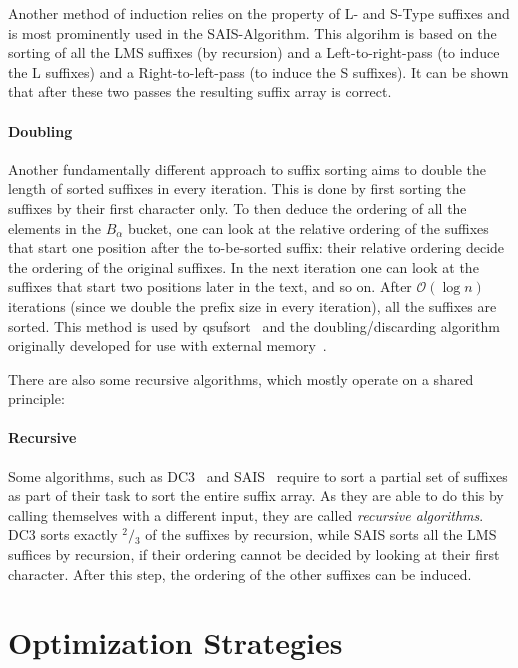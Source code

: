 Another method of induction relies on the property of L- and S-Type suffixes and
is most prominently used in the SAIS-Algorithm.
This algorihm is based on the sorting of all the LMS suffixes (by recursion)
and a Left-to-right-pass (to induce the L suffixes)
and a Right-to-left-pass (to induce the S suffixes).
It can be shown that after these two passes the resulting suffix array is correct.

\paragraph{Doubling} Another fundamentally different approach to suffix sorting
aims to double the length of sorted suffixes in every iteration.
This is done by first sorting the suffixes by their first character only.
To then deduce the ordering of all the elements in the $B_\alpha$ bucket,
one can look at the relative ordering of the suffixes that start one position
after the to-be-sorted suffix:
their relative ordering decide the ordering of the original suffixes.
In the next iteration one can look at the suffixes that start two positions later in the text,
and so on.
After $\mathcal O(\log n)$ iterations (since we double the prefix size in every iteration),
all the suffixes are sorted.
This method is used by qsufsort~\cite{unknown} and the
doubling/discarding algorithm originally developed for use with external memory~\cite{saca:11}.

\bigskip

There are also some recursive algorithms, which mostly operate on a shared principle:
%
\paragraph{Recursive} Some algorithms, such as DC3~\cite{xxx} and SAIS~\cite{xxx} require to sort a
partial set of suffixes as part of their task to sort the entire suffix array.
As they are able to do this by calling themselves with a different input, they are called \emph{recursive algorithms}.
DC3 sorts exactly $^2\!/\!_3$ of the suffixes by recursion, while SAIS sorts all the LMS suffices by recursion,
if their ordering cannot be decided by looking at their first character.
After this step, the ordering of the other suffixes can be induced.

\bigskip

\section{Optimization Strategies}

